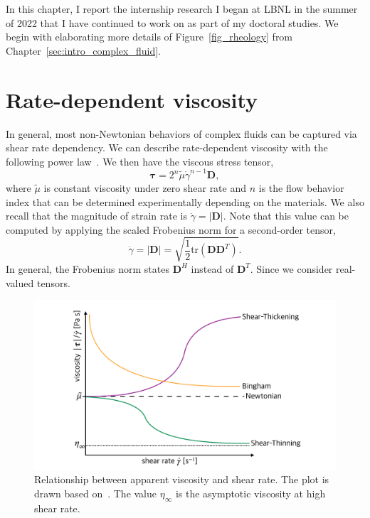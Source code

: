 \par
In this chapter, I report the internship research I began at LBNL in the summer of 2022 that I have continued to work on as part of my doctoral studies.
We begin with elaborating more details of Figure~\ref{fig_rheology} from Chapter~\ref{sec:intro_complex_fluid}. 

\section{Rate-dependent viscosity}
In general, most non-Newtonian behaviors of complex fluids can be captured via shear rate dependency. 
We can describe rate-dependent viscosity with the following power law~\cite{herschel_konsistenzmessungen_1926}. We then have the viscous stress tensor, 
\begin{equation}
  {\bm \tau}
  =2^n \tilde{\mu} \dot{\gamma} ^{n-1} {\bm D},
  \label{eq_HS_tau}
  \end{equation}
where $\tilde{\mu}$ is constant viscosity under zero shear rate and $n$ is the flow behavior index that can be determined experimentally depending on the materials.
We also recall that the magnitude of strain rate is $\dot{\gamma} = |\bm{D}|$.
Note that this value can be computed by applying the scaled Frobenius norm for a second-order tensor, 
\[
  \dot{\gamma}  = |\bm{D}| = \sqrt{\frac{1}{2}
    \text{tr}\left(\bm{D} \bm{D}^{T} \right)}.
\]
In general, the Frobenius norm states $\bm{D}^H$ instead of $\bm{D}^T$. Since we consider real-valued tensors.
\begin{figure}[ht]
  \begin{center}
    \includegraphics[scale=0.19]{figures/fig_appr_viscosity.pdf}
    \end{center}
  \caption{Relationship between apparent viscosity and shear rate. The plot is drawn based on~\cite{irgens_rheology_2014}. The value $\eta_{\infty}$ is the asymptotic viscosity at high shear rate.}
  \label{fig_appr_viscosity}
\end{figure}
